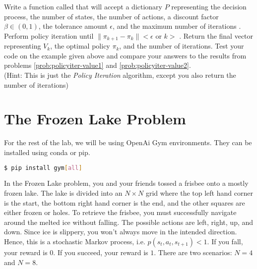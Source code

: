 \begin{problem}
\label{prob:policyiter-value4}
Write a function called  that will accept a dictionary $P$ representing the decision process, the number of states, the number of actions, a discount factor $\beta \in (0,1)$, the tolerance amount $\epsilon$, and the maximum number of iterations .
Perform policy iteration until $\|\pi_{k+1} - \pi_{k}\| < \epsilon$ or $k > $ .
Return the final vector representing $V_k$, the optimal policy $\pi_k$, and the number of iterations.
Test your code on the example given above and compare your answers to the results from problems \ref{prob:policyiter-value1} and \ref{prob:policyiter-value2}.
\\(Hint: This is just the \emph{Policy Iteration} algorithm, except you also return the number of iterations)
\end{problem}



\section*{The Frozen Lake Problem}
For the rest of the lab, we will be using OpenAi Gym environments.
They can be installed using conda or pip.
\begin{lstlisting}[language=Bash]
$ pip install gym[all]
\end{lstlisting}

In the Frozen Lake problem, you and your friends tossed a frisbee onto a mostly frozen lake.
The lake is divided into an $N \times N$ grid where the top left hand corner is the start, the bottom right hand corner is the end, and the other squares are either frozen or holes.
To retrieve the frisbee, you must successfully navigate around the melted ice without falling.
The possible actions are left, right, up, and down.
Since ice is slippery, you won't always move in the intended direction.
Hence, this is a stochastic Markov process, i.e. $p(s_t,a_t,s_{t+1})<1$.
If you fall, your reward is $0$.
If you succeed, your reward is $1$.
There are two scenarios: $N=4$ and $N=8$.


